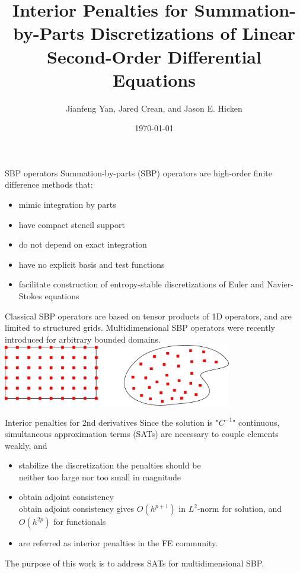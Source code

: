 \documentclass{beamer}
\title[Interior Penalties for SBP Discretizations of 2nd PDEs]{Interior Penalties for Summation-by-Parts Discretizations of Linear Second-Order Differential Equations}
\author[Yan \textit{et al}]{Jianfeng Yan, Jared Crean, and Jason E. Hicken}
\institute[]{\normalsize Dept. of MANE, RPI}
\date[]
{\today}
\begin{document}
\begin{frame}
    \titlepage
\end{frame}

\begin{frame}{SBP operators}
    Summation-by-parts (SBP) operators are high-order finite difference methods that:
    \begin{itemize}
        \item mimic integration by parts
        \item have compact stencil support
        \item do not depend on exact integration
        \item have no explicit basis and test functions
        \item facilitate construction of entropy-stable discretizations of Euler and Navier-Stokes equations
    \end{itemize}
\end{frame}

\begin{frame}
    Classical SBP operators are based on tensor products of 1D operators, and are limited to structured grids. Multidimensional SBP operators were recently introduced for arbitrary bounded domains\cite{Hicken2016SIAM}.
    \vskip 10mm
    \centering
    \includegraphics[width=0.75\textwidth]{./figures/generalize_tensor.pdf}
\end{frame}

\begin{frame}{Interior penalties for 2nd derivatives}
    Since the solution is "$C^{-1}$" continuous, simultaneous 
    approximation terms (SATs) are necessary to couple elements weakly, and 
    \begin{itemize}
        \item stabilize the discretization the penalties should be \\ neither too large nor too small in magnitude\cite{Arnold2002}
        \item obtain adjoint consistency \\
        obtain adjoint consistency gives $O(h^{p+1})$ in $L^2$-norm for solution, and $O(h^{2p})$ for functionals\cite{hartmann:2007b}
        \item are referred as interior penalties in the FE community.
    \end{itemize}
    \vskip 5mm
    The purpose of this work is to address SATs for multidimensional SBP.
\end{frame}
\end{document}
